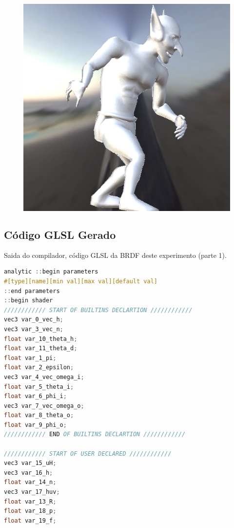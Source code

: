 \begin{figure}[H]
\endminipage\hfill
{}%
  \includegraphics[width=\linewidth]{./Imagens/brdfs/edwards-2006-goblin.png}
\endminipage
\end{figure}

\subsection{Código GLSL Gerado}
\begin{codigo}[H]
    \caption{\small Saida do compilador, código GLSL da BRDF deste experimento (parte 1). }
    \label{cod-edwards-2006-glsl-pt-1}
\begin{lstlisting}[language=C, inputencoding=utf8]
analytic ::begin parameters
#[type][name][min val][max val][default val]
::end parameters
::begin shader
//////////// START OF BUILTINS DECLARTION ////////////
vec3 var_0_vec_h;
vec3 var_3_vec_n;
float var_10_theta_h;
float var_11_theta_d;
float var_1_pi;
float var_2_epsilon;
vec3 var_4_vec_omega_i;
float var_5_theta_i;
float var_6_phi_i;
vec3 var_7_vec_omega_o;
float var_8_theta_o;
float var_9_phi_o;
//////////// END OF BUILTINS DECLARTION ////////////

//////////// START OF USER DECLARED ////////////
vec3 var_15_uH;
vec3 var_16_h;
float var_14_n;
vec3 var_17_huv;
float var_13_R;
float var_18_p;
float var_19_f;
\end{lstlisting}
\end{codigo}

